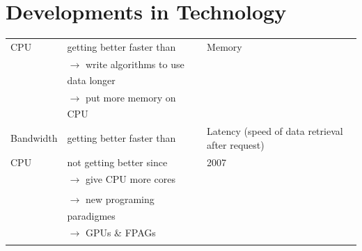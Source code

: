 \documentclass[a4paper]{article}
\begin{document}
\section{Developments in Technology}
	\begin{tabular}{lll}
	CPU & getting better faster than & Memory\\
	& $\xrightarrow[]{}$ write algorithms to use data longer & \\
	& $\xrightarrow[]{}$ put more memory on CPU & \\
	Bandwidth & getting better faster than & Latency (speed of data retrieval after request)\\
	CPU & not getting better since & 2007\\
	& $\xrightarrow[]{}$ give CPU more cores&\\
	& $\xrightarrow[]{}$ new programing paradigmes&\\
	& $\xrightarrow[]{}$ GPUs \& FPAGs&\\
	\end{tabular}
\end{document}
